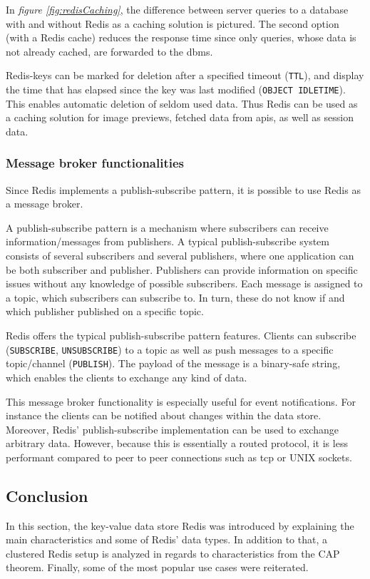 In \textit{figure \ref{fig:redisCaching}}, the difference between server queries
to a database with and without Redis as a caching solution is pictured. The
second option (with a Redis cache) reduces the response time since only queries,
whose data is not already cached, are forwarded to the \gls{dbms}.

Redis-keys can be marked for deletion after a specified timeout (\texttt{TTL}),
and display the time that has elapsed since the key was last modified
(\texttt{OBJECT IDLETIME}). This enables automatic deletion of seldom used
data.  Thus Redis can be used as a caching solution for image previews, fetched
data from \acrshort{api}s, as well as session data. \parencite{redis:commands}

\subsubsection{Message broker functionalities}
Since Redis implements a publish-subscribe pattern, it is possible to use Redis
as a message broker.

A publish-subscribe pattern is a mechanism where subscribers can receive
information/messages from publishers. A typical publish-subscribe system
consists of several subscribers and several publishers, where one application can
be both subscriber and publisher. Publishers can provide information on specific
issues without any knowledge of possible subscribers. Each message is assigned
to a topic, which subscribers can subscribe to. In turn, these do not know if and
which publisher published on a specific topic. \parencite{redis:ibmPubSub}

Redis offers the typical publish-subscribe pattern features. Clients can
subscribe (\texttt{SUBSCRIBE}, \texttt{UNSUBSCRIBE}) to a topic as well as push
messages to a specific topic/channel (\texttt{PUBLISH}). The payload of the
message is a binary-safe string, which enables the clients to exchange any kind
of data.

This message broker functionality is especially useful for event notifications.
For instance the clients can be notified about changes within the data store.
Moreover, Redis' publish-subscribe implementation can be used to exchange
arbitrary data. However, because this is essentially a routed protocol, it is
less performant compared to peer to peer connections such as \gls{tcp} or UNIX
sockets. \parencite{redis:PubSub}

\subsection{Conclusion}
In this section, the key-value data store Redis was introduced by explaining the
main characteristics and some of Redis' data types. In addition to that, a
clustered Redis setup is analyzed in regards to characteristics from the CAP
theorem.  Finally, some of the most popular use cases were reiterated.

